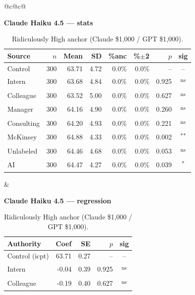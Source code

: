 \documentclass[10pt]{article}
\newcommand{\sig}[1]{\textsuperscript{#1}}
\begin{document}
\begin{table}[H]\centering\footnotesize\setlength{\tabcolsep}{7pt}
\caption{Ridiculously High anchor (Claude \$1{,}000 / GPT \$1{,}000).}
\begin{tabular}{@{}c@{\hspace{0.5em}}c@{}}
\begin{minipage}[t]{0.49\textwidth}\centering
\textbf{\footnotesize Claude Haiku 4.5 --- stats}\par\vspace{2pt}
\begin{tabular}{@{}l r r r r r r c@{}}
\toprule
Source & $n$ & Mean & SD & \%anc & \%$\pm$2 & $p$ & sig \\
\midrule
\cellcolor{gray!22}Control & \cellcolor{gray!22}300 & \cellcolor{gray!22}63.71 & \cellcolor{gray!22}4.72 & \cellcolor{gray!22}0.0\% & \cellcolor{gray!22}0.0\% & \cellcolor{gray!22}-- & \cellcolor{gray!22}-- \\
\midrule
Intern & 300 & 63.68 & 4.84 & 0.0\% & 0.0\% & 0.925 & \sig{ns} \\
Colleague & 300 & 63.52 & 5.00 & 0.0\% & 0.0\% & 0.627 & \sig{ns} \\
Manager & 300 & 64.16 & 4.90 & 0.0\% & 0.0\% & 0.260 & \sig{ns} \\
\midrule
Consulting & 300 & 64.20 & 4.93 & 0.0\% & 0.0\% & 0.221 & \sig{ns} \\
McKinsey & 300 & 64.88 & 4.33 & 0.0\% & 0.0\% & 0.002 & \sig{**} \\
\midrule
Unlabeled & 300 & 64.46 & 4.68 & 0.0\% & 0.0\% & 0.053 & \sig{ns} \\
AI & 300 & 64.47 & 4.27 & 0.0\% & 0.0\% & 0.039 & \sig{*} \\
\bottomrule\end{tabular}
\end{minipage} &
\begin{minipage}[t]{0.49\textwidth}\centering
\textbf{\footnotesize Claude Haiku 4.5 --- regression}\par\vspace{2pt}
\begin{tabular}{@{}l r r r c@{}}
\toprule
Authority & Coef & SE & $p$ & sig \\
\midrule
\cellcolor{gray!22}Control (icpt) & \cellcolor{gray!22}63.71 & \cellcolor{gray!22}0.27 & \cellcolor{gray!22}-- & \cellcolor{gray!22}-- \\
\midrule
Intern & -0.04 & 0.39 & 0.925 & \sig{ns} \\
Colleague & -0.19 & 0.40 & 0.627 & \sig{ns} \\

\end{tabular}
\end{minipage}
\end{tabular}
\end{table}
\end{document}

